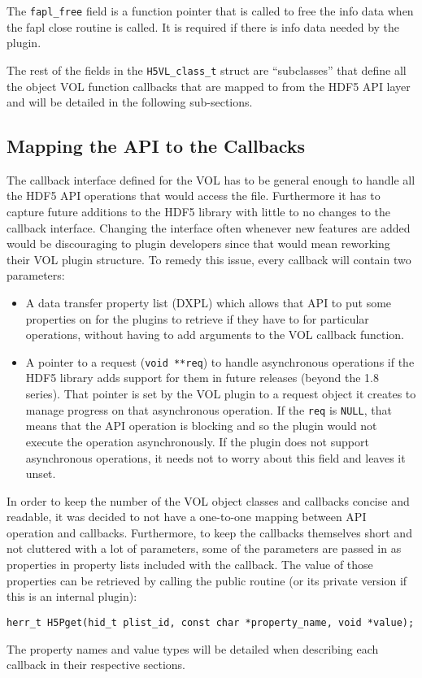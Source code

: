 The {\tt fapl\_free} field is a function pointer that is called to
free the info data when the fapl close routine is called. It is
required if there is info data needed by the plugin.

The rest of the fields in the {\tt H5VL\_class\_t} struct are
``subclasses'' that define all the object VOL function callbacks that
are mapped to from the HDF5 API layer and will be detailed in the
following sub-sections.

\subsection{Mapping the API to the Callbacks}
\label{sec:map}

The callback interface defined for the VOL has to be general enough to
handle all the HDF5 API operations that would access the
file. Furthermore it has to capture future additions to the HDF5
library with little to no changes to the callback interface. Changing
the interface often whenever new features are added would be
discouraging to plugin developers since that would mean reworking
their VOL plugin structure. To remedy this issue, every callback will
contain two parameters:
\begin{itemize}
\item A data transfer property list (DXPL) which allows that API to
  put some properties on for the plugins to retrieve if they have to
  for particular operations, without having to add arguments to the
  VOL callback function.
\item A pointer to a request ({\tt void **req}) to handle asynchronous
  operations if the HDF5 library adds support for them in future
  releases (beyond the 1.8 series). That pointer is set by the VOL
  plugin to a request object it creates to manage progress on that
  asynchronous operation. If the {\tt req} is {\tt NULL}, that means
  that the API operation is blocking and so the plugin would not
  execute the operation asynchronously. If the plugin does not support
  asynchronous operations, it needs not to worry about this field and
  leaves it unset.
\end{itemize}

In order to keep the number of the VOL object classes and callbacks
concise and readable, it was decided to not have a one-to-one mapping
between API operation and callbacks. Furthermore, to keep the
callbacks themselves short and not cluttered with a lot of parameters,
some of the parameters are passed in as properties in property lists
included with the callback. The value of those properties can be
retrieved by calling the public routine (or its private version if
this is an internal plugin): 
\begin{lstlisting}
herr_t H5Pget(hid_t plist_id, const char *property_name, void *value);
\end{lstlisting}
The property names and value types will be detailed when describing
each callback in their respective sections.

